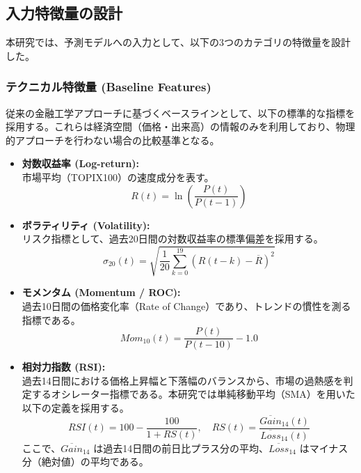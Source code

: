 \documentclass[11pt,a4paper,oneside]{ltjsarticle}
\begin{document}
\subsection{入力特徴量の設計}
本研究では、予測モデルへの入力として、以下の3つのカテゴリの特徴量を設計した。

\subsubsection{テクニカル特徴量 (Baseline Features)}
従来の金融工学アプローチに基づくベースラインとして、以下の標準的な指標を採用する。これらは経済空間（価格・出来高）の情報のみを利用しており、物理的アプローチを行わない場合の比較基準となる。

\begin{itemize}
    \item \textbf{対数収益率 (Log-return):} \\
    市場平均（TOPIX100）の速度成分を表す。
    \begin{equation}
        R(t) = \ln \left( \frac{P(t)}{P(t-1)} \right)
    \end{equation}

    \item \textbf{ボラティリティ (Volatility):} \\
    リスク指標として、過去20日間の対数収益率の標準偏差を採用する。
    \begin{equation}
        \sigma_{20}(t) = \sqrt{\frac{1}{20} \sum_{k=0}^{19} (R(t-k) - \overline{R})^2}
    \end{equation}

    \item \textbf{モメンタム (Momentum / ROC):} \\
    過去10日間の価格変化率（Rate of Change）であり、トレンドの慣性を測る指標である。
    \begin{equation}
        Mom_{10}(t) = \frac{P(t)}{P(t-10)} - 1.0
    \end{equation}

    \item \textbf{相対力指数 (RSI):} \\
    過去14日間における価格上昇幅と下落幅のバランスから、市場の過熱感を判定するオシレーター指標である。本研究では単純移動平均（SMA）を用いた以下の定義を採用する。
    \begin{equation}
        RSI(t) = 100 - \frac{100}{1 + RS(t)}, \quad RS(t) = \frac{\overline{Gain}_{14}(t)}{\overline{Loss}_{14}(t)}
    \end{equation}
    ここで、$\overline{Gain}_{14}$ は過去14日間の前日比プラス分の平均、$\overline{Loss}_{14}$ はマイナス分（絶対値）の平均である。
\end{itemize}
\end{document}
